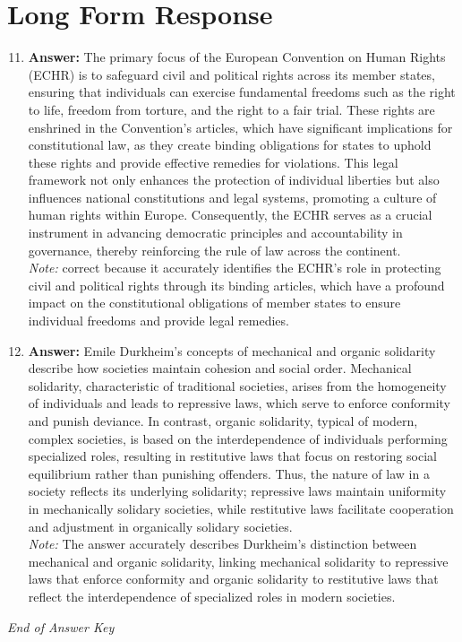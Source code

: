 \documentclass[12pt]{article}
\begin{document}
\section*{Long Form Response}
\begin{enumerate}[label=\arabic*.]
\setcounter{enumi}{10}
\item \textbf{Answer:} The primary focus of the European Convention on Human Rights (ECHR) is to safeguard civil and political rights across its member states, ensuring that individuals can exercise fundamental freedoms such as the right to life, freedom from torture, and the right to a fair trial. These rights are enshrined in the Convention's articles, which have significant implications for constitutional law, as they create binding obligations for states to uphold these rights and provide effective remedies for violations. This legal framework not only enhances the protection of individual liberties but also influences national constitutions and legal systems, promoting a culture of human rights within Europe. Consequently, the ECHR serves as a crucial instrument in advancing democratic principles and accountability in governance, thereby reinforcing the rule of law across the continent.
\\ \textit{Note:} correct because it accurately identifies the ECHR's role in protecting civil and political rights through its binding articles, which have a profound impact on the constitutional obligations of member states to ensure individual freedoms and provide legal remedies.
\item \textbf{Answer:} Emile Durkheim's concepts of mechanical and organic solidarity describe how societies maintain cohesion and social order. Mechanical solidarity, characteristic of traditional societies, arises from the homogeneity of individuals and leads to repressive laws, which serve to enforce conformity and punish deviance. In contrast, organic solidarity, typical of modern, complex societies, is based on the interdependence of individuals performing specialized roles, resulting in restitutive laws that focus on restoring social equilibrium rather than punishing offenders. Thus, the nature of law in a society reflects its underlying solidarity; repressive laws maintain uniformity in mechanically solidary societies, while restitutive laws facilitate cooperation and adjustment in organically solidary societies.
\\ \textit{Note:} The answer accurately describes Durkheim's distinction between mechanical and organic solidarity, linking mechanical solidarity to repressive laws that enforce conformity and organic solidarity to restitutive laws that reflect the interdependence of specialized roles in modern societies.
\end{enumerate}

\vfill
\noindent\textit{End of Answer Key}
\end{document}
